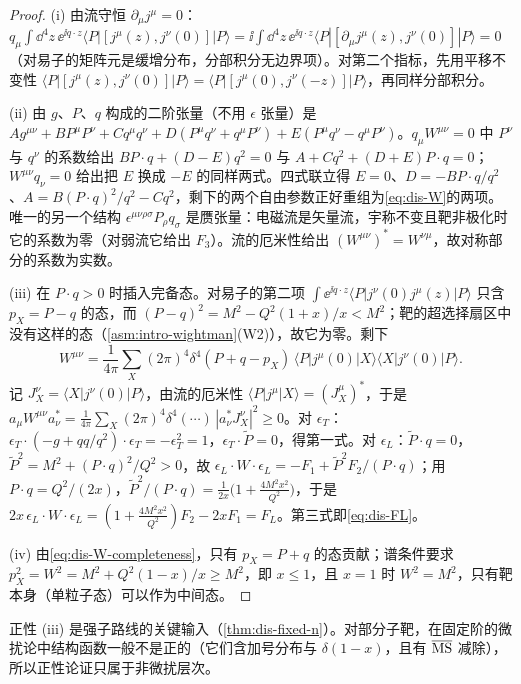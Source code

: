 \begin{proof}
(i) 由流守恒 $\partial_\mu j^\mu=0$：$q_\mu\int\dd^4z\,\ee^{\ii q\cdot z}\langle P|[j^\mu(z),j^\nu(0)]|P\rangle=\ii\int\dd^4z\,\ee^{\ii q\cdot z}\langle P|[\partial_\mu j^\mu(z),j^\nu(0)]|P\rangle=0$（对易子的矩阵元是缓增分布，分部积分无边界项）。对第二个指标，先用平移不变性 $\langle P|[j^\mu(z),j^\nu(0)]|P\rangle=\langle P|[j^\mu(0),j^\nu(-z)]|P\rangle$，再同样分部积分。

(ii) 由 $g$、$P$、$q$ 构成的二阶张量（不用 $\epsilon$ 张量）是 $Ag^{\mu\nu}+BP^\mu P^\nu+Cq^\mu q^\nu+D(P^\mu q^\nu+q^\mu P^\nu)+E(P^\mu q^\nu-q^\mu P^\nu)$。$q_\mu W^{\mu\nu}=0$ 中 $P^\nu$ 与 $q^\nu$ 的系数给出 $BP\cdot q+(D-E)q^2=0$ 与 $A+Cq^2+(D+E)P\cdot q=0$；$W^{\mu\nu}q_\nu=0$ 给出把 $E$ 换成 $-E$ 的同样两式。四式联立得 $E=0$、$D=-BP\cdot q/q^2$、$A=B(P\cdot q)^2/q^2-Cq^2$，剩下的两个自由参数正好重组为\cref{eq:dis-W}的两项。唯一的另一个结构 $\epsilon^{\mu\nu\rho\sigma}P_\rho q_\sigma$ 是赝张量：电磁流是矢量流，宇称不变且靶非极化时它的系数为零（对弱流它给出 $F_3$）。流的厄米性给出 $(W^{\mu\nu})^*=W^{\nu\mu}$，故对称部分的系数为实数。

(iii) 在 $P\cdot q>0$ 时插入完备态。对易子的第二项 $\int\ee^{\ii q\cdot z}\langle P|j^\nu(0)j^\mu(z)|P\rangle$ 只含 $p_X=P-q$ 的态，而 $(P-q)^2=M^2-Q^2(1+x)/x<M^2$；靶的超选择扇区中没有这样的态（\cref{asm:intro-wightman}(W2)），故它为零。剩下
\begin{equation}\label{eq:dis-W-completeness}
W^{\mu\nu}=\frac1{4\pi}\sum_X(2\pi)^4\delta^4(P+q-p_X)\,\langle P|j^\mu(0)|X\rangle\langle X|j^\nu(0)|P\rangle .
\end{equation}
记 $J^\nu_X=\langle X|j^\nu(0)|P\rangle$，由流的厄米性 $\langle P|j^\mu|X\rangle=(J^\mu_X)^*$，于是 $a_\mu W^{\mu\nu}a^*_\nu=\frac1{4\pi}\sum_X(2\pi)^4\delta^4(\cdots)\,|a^*_\nu J^\nu_X|^2\ge0$。对 $\epsilon_T$：$\epsilon_T\cdot(-g+qq/q^2)\cdot\epsilon_T=-\epsilon_T^2=1$，$\epsilon_T\cdot\tilde P=0$，得第一式。对 $\epsilon_L$：$\tilde P\cdot q=0$，$\tilde P^2=M^2+(P\cdot q)^2/Q^2>0$，故 $\epsilon_L\cdot W\cdot\epsilon_L=-F_1+\tilde P^2F_2/(P\cdot q)$；用 $P\cdot q=Q^2/(2x)$，$\tilde P^2/(P\cdot q)=\frac1{2x}\big(1+\frac{4M^2x^2}{Q^2}\big)$，于是 $2x\,\epsilon_L\cdot W\cdot\epsilon_L=(1+\frac{4M^2x^2}{Q^2})F_2-2xF_1=F_L$。第三式即\cref{eq:dis-FL}。

(iv) 由\cref{eq:dis-W-completeness}，只有 $p_X=P+q$ 的态贡献；谱条件要求 $p_X^2=W^2=M^2+Q^2(1-x)/x\ge M^2$，即 $x\le1$，且 $x=1$ 时 $W^2=M^2$，只有靶本身（单粒子态）可以作为中间态。
\end{proof}

正性 (iii) 是强子路线的关键输入（\cref{thm:dis-fixed-n}）。对部分子靶，在固定阶的微扰论中结构函数一般不是正的（它们含加号分布与 $\delta(1-x)$，且有 $\overline{\rm MS}$ 减除），所以正性论证只属于非微扰层次。
